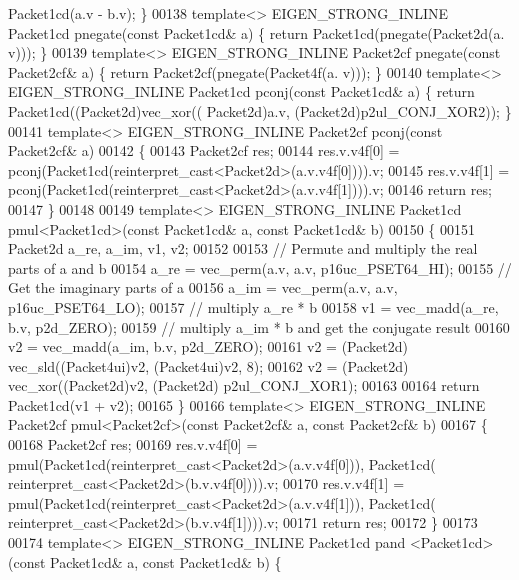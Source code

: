 \begin{DoxyCode}
      Packet1cd(a.v - b.v); \}
00138 \textcolor{keyword}{template}<> EIGEN\_STRONG\_INLINE Packet1cd pnegate(\textcolor{keyword}{const} Packet1cd& a) \{ \textcolor{keywordflow}{return} Packet1cd(pnegate(Packet2d(a.
      v))); \}
00139 \textcolor{keyword}{template}<> EIGEN\_STRONG\_INLINE Packet2cf pnegate(\textcolor{keyword}{const} Packet2cf& a) \{ \textcolor{keywordflow}{return} Packet2cf(pnegate(Packet4f(a.
      v))); \}
00140 \textcolor{keyword}{template}<> EIGEN\_STRONG\_INLINE Packet1cd pconj(\textcolor{keyword}{const} Packet1cd& a) \{ \textcolor{keywordflow}{return} Packet1cd((Packet2d)vec\_xor((
      Packet2d)a.v, (Packet2d)p2ul\_CONJ\_XOR2)); \}
00141 \textcolor{keyword}{template}<> EIGEN\_STRONG\_INLINE Packet2cf pconj(\textcolor{keyword}{const} Packet2cf& a)
00142 \{
00143   Packet2cf res;
00144   res.v.v4f[0] = pconj(Packet1cd(reinterpret\_cast<Packet2d>(a.v.v4f[0]))).v;
00145   res.v.v4f[1] = pconj(Packet1cd(reinterpret\_cast<Packet2d>(a.v.v4f[1]))).v;
00146   \textcolor{keywordflow}{return} res;
00147 \}
00148 
00149 \textcolor{keyword}{template}<> EIGEN\_STRONG\_INLINE Packet1cd pmul<Packet1cd>(\textcolor{keyword}{const} Packet1cd& a, \textcolor{keyword}{const} Packet1cd& b)
00150 \{
00151   Packet2d a\_re, a\_im, v1, v2;
00152 
00153   \textcolor{comment}{// Permute and multiply the real parts of a and b}
00154   a\_re = vec\_perm(a.v, a.v, p16uc\_PSET64\_HI);
00155   \textcolor{comment}{// Get the imaginary parts of a}
00156   a\_im = vec\_perm(a.v, a.v, p16uc\_PSET64\_LO);
00157   \textcolor{comment}{// multiply a\_re * b}
00158   v1 = vec\_madd(a\_re, b.v, p2d\_ZERO);
00159   \textcolor{comment}{// multiply a\_im * b and get the conjugate result}
00160   v2 = vec\_madd(a\_im, b.v, p2d\_ZERO);
00161   v2 = (Packet2d) vec\_sld((Packet4ui)v2, (Packet4ui)v2, 8);
00162   v2 = (Packet2d) vec\_xor((Packet2d)v2, (Packet2d) p2ul\_CONJ\_XOR1);
00163 
00164   \textcolor{keywordflow}{return} Packet1cd(v1 + v2);
00165 \}
00166 \textcolor{keyword}{template}<> EIGEN\_STRONG\_INLINE Packet2cf pmul<Packet2cf>(\textcolor{keyword}{const} Packet2cf& a, \textcolor{keyword}{const} Packet2cf& b)
00167 \{
00168   Packet2cf res;
00169   res.v.v4f[0] = pmul(Packet1cd(reinterpret\_cast<Packet2d>(a.v.v4f[0])), Packet1cd(
      reinterpret\_cast<Packet2d>(b.v.v4f[0]))).v;
00170   res.v.v4f[1] = pmul(Packet1cd(reinterpret\_cast<Packet2d>(a.v.v4f[1])), Packet1cd(
      reinterpret\_cast<Packet2d>(b.v.v4f[1]))).v;
00171   \textcolor{keywordflow}{return} res;
00172 \}
00173 
00174 \textcolor{keyword}{template}<> EIGEN\_STRONG\_INLINE Packet1cd pand   <Packet1cd>(\textcolor{keyword}{const} Packet1cd& a, \textcolor{keyword}{const} Packet1cd& b) \{ \textcolor{keywordflow}{
}
\end{DoxyCode}
